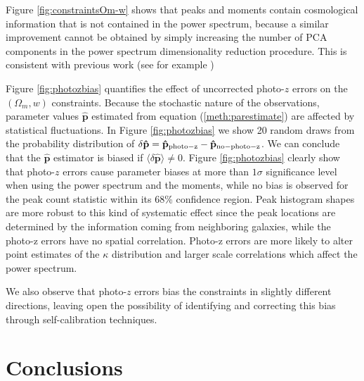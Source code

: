 \documentclass[reprint,aps,prd,superscriptaddress,showkeys,showpacs]{revtex4-1}
\newcommand{\bbh}[1]{\mathbf{\hat{#1}}}
\begin{document}
Figure \ref{fig:constraintsOm-w} shows that peaks and moments contain cosmological information that is not contained in the power spectrum, because a similar improvement cannot be obtained by simply increasing the number of PCA components in the power spectrum dimensionality reduction procedure. This is consistent with previous work (see for example \citep{CFHTMink})

Figure \ref{fig:photozbias} quantifies the effect of uncorrected photo-$z$ errors on the $(\Omega_m,w)$ constraints. Because the stochastic nature of the observations, parameter values $\bbh{p}$ estimated from equation (\ref{meth:parestimate}) are affected by statistical fluctuations. In Figure \ref{fig:photozbias} we show 20 random draws from the probability distribution of $\delta \bbh{p}=\bbh{p}_{\rm photo-z}-\bbh{p}_{\rm no-photo-z}$. We can conclude that the $\bbh{p}$ estimator is biased if $\langle\delta\bbh{p}\rangle\neq 0$. Figure \ref{fig:photozbias} clearly show that photo-$z$ errors cause parameter biases at more than $1\sigma$ significance level when using the power spectrum and the moments, while no bias is observed for the peak count statistic within its 68\% confidence region. Peak histogram shapes are more robust to this kind of systematic effect since the peak locations are determined by the information coming from neighboring galaxies, while the photo-z errors have no spatial correlation. Photo-z errors are more likely to alter point estimates of the $\kappa$ distribution and larger scale correlations which affect the power spectrum.

We also observe that photo-$z$ errors bias the constraints in slightly different directions, leaving open the possibility of identifying and correcting this bias through self-calibration techniques.         


\section{Conclusions}
\label{sec:conclusions}
\end{document}
